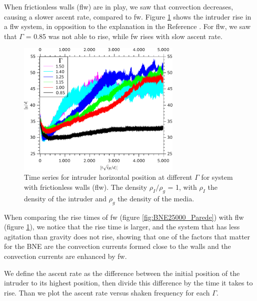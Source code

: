     When frictionless walls (flw) are in play, we saw that convection decreases, causing a slower ascent rate, compared to fw. Figure \ref{fig:BNE25000_sem_Atrito_Parede} shows the intruder rise in a flw system, in opposition to the explanation in the Reference \cite{Inertia_in_the_Brazil_nut_problem}. For flw, we saw that $\Gamma$ = 0.85 was not able to rise, while fw rises with slow ascent rate.

\begin{figure}[H]
    \centering
    \includegraphics[width=0.7\textwidth]{04-figuras/BNE25000PsemAtrito.pdf}
    \caption[BNE with frictionless walls.]{Time series for intruder horizontal position at different $\Gamma$ for system with frictionless walls (flw). The density $\rho_I/\rho_g$ = 1, with $\rho_I$ the density of the intruder and $\rho_g$ the density of the media.}
    \label{fig:BNE25000_sem_Atrito_Parede}
\end{figure}

    When comparing the rise times of fw (figure \ref{fig:BNE25000_Parede}) with flw (figure \ref{fig:BNE25000_sem_Atrito_Parede}), we notice that the rise time is larger, and the system that has less agitation than gravity does not rise, showing that one of the factors that matter for the BNE are the convection currents formed close to the walls and the convection currents are enhanced by fw.

    We define the ascent rate as the difference between the initial position of the intruder to its highest position, then divide this difference by the time it takes to rise. Than we plot the ascent rate versus shaken frequency for each $\Gamma$.

